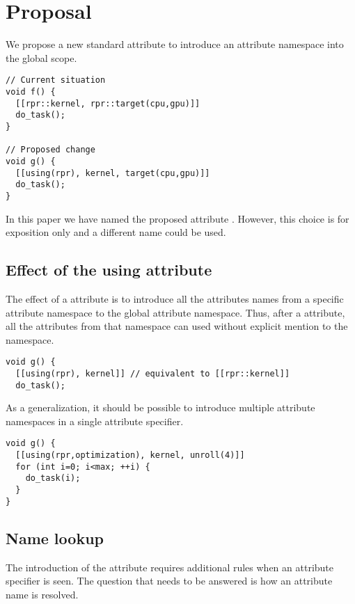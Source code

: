 \section{Proposal}

We propose a new standard attribute to introduce an attribute namespace
into the global scope.

\begin{lstlisting}
// Current situation
void f() {
  [[rpr::kernel, rpr::target(cpu,gpu)]]
  do_task();
}

// Proposed change
void g() {
  [[using(rpr), kernel, target(cpu,gpu)]]
  do_task();
}
\end{lstlisting}

In this paper we have named the proposed attribute . However,
this choice is for exposition only and a different name could be used.

\subsection{Effect of the using attribute}

The effect of a  attribute is to introduce all the attributes
names from a specific attribute namespace to the global attribute namespace.
Thus, after a  attribute, all the attributes from that namespace
can used without explicit mention to the namespace.

\begin{lstlisting}
void g() {
  [[using(rpr), kernel]] // equivalent to [[rpr::kernel]]
  do_task();
\end{lstlisting}

As a generalization, it should be possible to introduce multiple attribute
namespaces in a single attribute specifier.

\begin{lstlisting}
void g() {
  [[using(rpr,optimization), kernel, unroll(4)]]
  for (int i=0; i<max; ++i) {
    do_task(i);
  }
}
\end{lstlisting}

\subsection{Name lookup}

The introduction of the  attribute requires additional
rules when an attribute specifier is seen. The question that needs to
be answered is how an attribute name is resolved.

